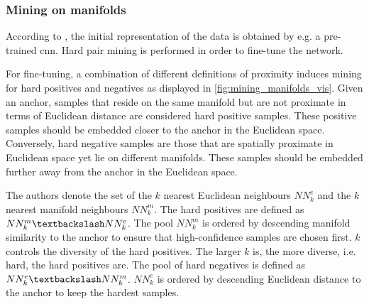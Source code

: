 \subsubsection{Mining on manifolds}\label{subsec:mining_manifolds}



According to \citet{mining_manifolds_2018}, the initial representation of the data is obtained by e.g. a pre-trained \ac{cnn}.
Hard pair mining is performed in order to fine-tune the network.

For fine-tuning, a combination of different definitions of proximity induces mining 
for hard positives and negatives as displayed in \autoref{fig:mining_manifolds_vis}.
Given an anchor, samples that reside on the same manifold but 
are not proximate in terms of Euclidean distance are considered hard positive samples.
These positive samples should be embedded closer to the anchor in the Euclidean space.
Conversely, hard negative samples are those that are spatially proximate in Euclidean space 
yet lie on different manifolds.
These samples should be embedded further away from the anchor in the Euclidean space.

The authors denote the set of the $k$ nearest Euclidean neighbours $NN^e_k$ and 
the $k$ nearest manifold neighbours $NN^m_k$.
The hard positives are defined as $NN^m_k \textbackslash NN^e_k$. 
The pool $NN^m_k$ is ordered by descending manifold similarity to the anchor
to ensure that high-confidence samples are chosen first.
$k$ controls the diversity of the hard positives.
The larger $k$ is, the more diverse, i.e. hard, the hard positives are. 
The pool of hard negatives is defined as $NN^e_k \textbackslash NN^m_k$.
$NN^e_k$ is ordered by descending Euclidean distance to the anchor to keep the hardest samples.

